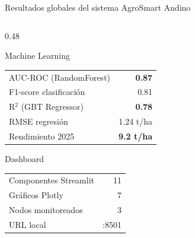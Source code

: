 \documentclass[14pt,aspectratio=169]{beamer}
\begin{document}
\begin{frame}{Resultados globales del sistema AgroSmart Andino}
\begin{columns}[T]
    \begin{column}{0.48\textwidth}
      \begin{block}{Machine Learning}
        \vspace{0.2em}
        \begin{tabular}{lr}
          \rowcolor{agroclear!80}
          AUC-ROC (RandomForest) & \textbf{0.87} \\
          F1-score clasificaci\'on & 0.81 \\
          \rowcolor{agroclear!80}
          R$^2$ (GBT Regressor) & \textbf{0.78} \\
          RMSE regresi\'on & 1.24 t/ha \\
          Rendimiento 2025 & \textbf{9.2 t/ha} \\
        \end{tabular}
        \vspace{0.2em}
      \end{block}
      \vspace{0.3em}
      \begin{block}{Dashboard}
        \vspace{0.2em}
        \begin{tabular}{lr}
          Componentes Streamlit & 11 \\
          Gr\'aficos Plotly & 7 \\
          Nodos monitoreados & 3 \\
          URL local & :8501 \\
        \end{tabular}
        \vspace{0.2em}
      \end{block}
    \end{column}
  \end{columns}
\end{frame}
\end{document}

